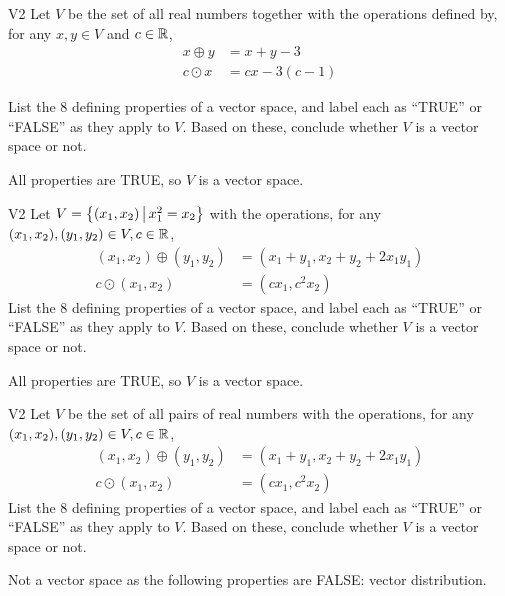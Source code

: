\begin{problem}{V2}
Let \(V\) be the  set of all real numbers together with the operations defined by, for any \(x,y\in V\) and \(c \in \mathbb{R}\),
\begin{align*}
x\oplus y  &= x+y-3 \\
c \odot x &= cx-3(c-1)
\end{align*}

  List the 8 defining properties of a vector space, and label each as
  ``TRUE'' or ``FALSE'' as they apply to \(V\). Based on these, conclude whether
  \(V\) is a vector space or not.
\end{problem}
\begin{solution}
All properties are TRUE, so \(V\) is a vector space.
\end{solution}


\begin{problem}{V2}
Let \(V=\left\{ (x_1,x_2)\,\middle|\,x_1^2=x_2\right\}\) with the operations, for any \((x_1,x_2), (y_1,y_2) \in V,c \in \mathbb{R}\),
\begin{align*}
(x_1,x_2) \oplus (y_1,y_2) &= (x_1+y_1,x_2+y_2+2x_1y_1) \\
c \odot (x_1,x_2) &= (cx_1, c^2x_2)
\end{align*}
  List the 8 defining properties of a vector space, and label each as
  ``TRUE'' or ``FALSE'' as they apply to \(V\). Based on these, conclude whether
  \(V\) is a vector space or not.

\end{problem}
\begin{solution}
All properties are TRUE, so \(V\) is a vector space.
\end{solution}


\begin{problem}{V2}
Let \(V\) be the set of all pairs of real numbers with the operations, for any \((x_1,x_2), (y_1,y_2) \in V,c \in \mathbb{R}\),
\begin{align*}
(x_1,x_2) \oplus (y_1,y_2) &= (x_1+y_1,x_2+y_2+2x_1y_1) \\
c \odot (x_1,x_2) &= (cx_1, c^2x_2)
\end{align*}
  List the 8 defining properties of a vector space, and label each as
  ``TRUE'' or ``FALSE'' as they apply to \(V\). Based on these, conclude whether
  \(V\) is a vector space or not.

\end{problem}
\begin{solution}
Not a vector space as the following properties are FALSE:
vector distribution.
\end{solution}

